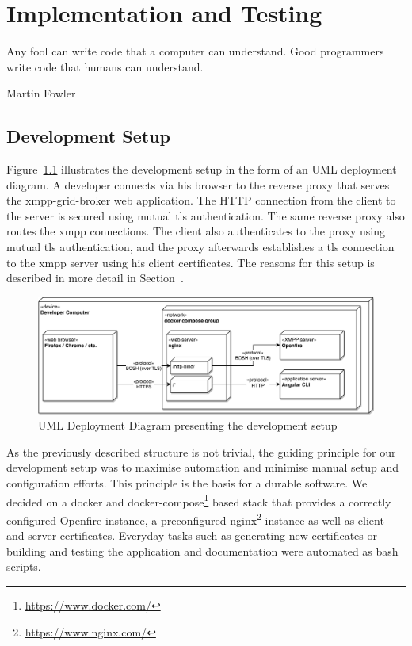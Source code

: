 \chapter{Implementation and Testing} %
\epigraph{Any fool can write code that a computer can understand. Good programmers write code that humans can understand.}{Martin Fowler}


\section{Development Setup}\label{sec:development-setup}

Figure~\ref{fig:development-setup} illustrates the development setup in the form of an UML deployment diagram.
A developer connects via his browser to the reverse proxy that serves the \gls{xmpp-grid-broker} web application.
The HTTP connection from the client to the server is secured using mutual \gls{tls} authentication.
The same reverse proxy also routes the \gls{xmpp} connections.
The client also authenticates to the proxy using mutual \gls{tls} authentication, and the proxy afterwards establishes a \gls{tls} connection to the \gls{xmpp} server using his client certificates.
The reasons for this setup is described in more detail in Section~.

\begin{figure}[h]
    \centering
    \includegraphics[width=1\linewidth]{resources/development-setup-uml}
    \caption{UML Deployment Diagram presenting the development setup}
    \label{fig:development-setup}
\end{figure}

As the previously described structure is not trivial, the guiding principle for our development setup was to maximise automation and minimise manual setup and configuration efforts. This principle is the basis for a durable software.
We decided on a docker and docker-compose\footnote{\url{https://www.docker.com/}} based stack that provides a correctly configured Openfire instance, a preconfigured nginx\footnote{\url{https://www.nginx.com/}} instance as well as client and server certificates.
Everyday tasks such as generating new certificates or building and testing the application and documentation were automated as bash scripts.

